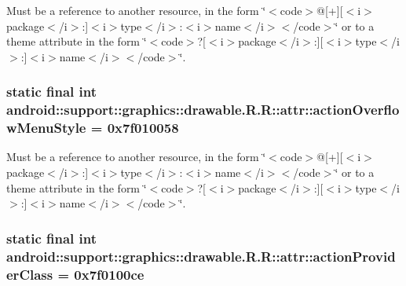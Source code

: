 Must be a reference to another resource, in the form \char`\"{}$<$code$>$@\mbox{[}+\mbox{]}\mbox{[}$<$i$>$package$<$/i$>$:\mbox{]}$<$i$>$type$<$/i$>$:$<$i$>$name$<$/i$>$$<$/code$>$\char`\"{} or to a theme attribute in the form \char`\"{}$<$code$>$?\mbox{[}$<$i$>$package$<$/i$>$:\mbox{]}\mbox{[}$<$i$>$type$<$/i$>$:\mbox{]}$<$i$>$name$<$/i$>$$<$/code$>$\char`\"{}. \hypertarget{classandroid_1_1support_1_1graphics_1_1drawable_1_1_r_1_1attr_e988faf561bf47a6e086c4dfdeb98172}{
\subsubsection[{actionOverflowMenuStyle}]{\setlength{\rightskip}{0pt plus 5cm}static final int android::support::graphics::drawable.R.R::attr::actionOverflowMenuStyle = 0x7f010058}}
\label{classandroid_1_1support_1_1graphics_1_1drawable_1_1_r_1_1attr_e988faf561bf47a6e086c4dfdeb98172}


Must be a reference to another resource, in the form \char`\"{}$<$code$>$@\mbox{[}+\mbox{]}\mbox{[}$<$i$>$package$<$/i$>$:\mbox{]}$<$i$>$type$<$/i$>$:$<$i$>$name$<$/i$>$$<$/code$>$\char`\"{} or to a theme attribute in the form \char`\"{}$<$code$>$?\mbox{[}$<$i$>$package$<$/i$>$:\mbox{]}\mbox{[}$<$i$>$type$<$/i$>$:\mbox{]}$<$i$>$name$<$/i$>$$<$/code$>$\char`\"{}. \hypertarget{classandroid_1_1support_1_1graphics_1_1drawable_1_1_r_1_1attr_febc4a5b8730f45bb8aef1c0f5a90fff}{
\subsubsection[{actionProviderClass}]{\setlength{\rightskip}{0pt plus 5cm}static final int android::support::graphics::drawable.R.R::attr::actionProviderClass = 0x7f0100ce}}
\label{classandroid_1_1support_1_1graphics_1_1drawable_1_1_r_1_1attr_febc4a5b8730f45bb8aef1c0f5a90fff}


